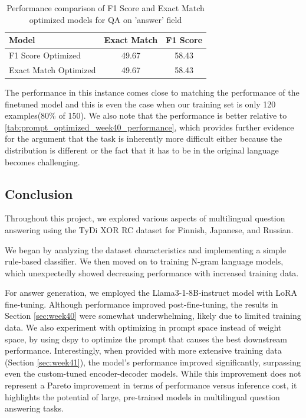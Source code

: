 \documentclass[11pt]{article}
\begin{document}

\begin{table}[ht]
    \centering
    \begin{tabular}{|l|c|c|}
        \hline
        Model & Exact Match & F1 Score \\
        \hline
        F1 Score Optimized & 49.67 & 58.43 \\
        Exact Match Optimized & 49.67 & 58.43 \\
        \hline
    \end{tabular}
    \caption{Performance comparison of F1 Score and Exact Match optimized models for QA on 'answer' field}
    \label{tab:prompt_optimized_week41_performance}
\end{table}


The performance in this instance comes close to matching the performance of the finetuned model and this is even the case when our training set is only 120 examples(80\% of 150).
We also note that the performance is better relative to \ref{tab:prompt_optimized_week40_performance}, which provides further evidence for the argument that the task is inherently more difficult either because the distribution is different or the fact that it has to be in the original language becomes challenging.
\subsection{Conclusion}

Throughout this project, we explored various aspects of multilingual question answering using the TyDi XOR RC dataset for Finnish, Japanese, and Russian. 

We began by analyzing the dataset characteristics and implementing a simple rule-based classifier. We then moved on to training N-gram language models, which unexpectedly showed decreasing performance with increased training data. 

For answer generation, we employed the Llama3-1-8B-instruct model with LoRA fine-tuning. Although performance improved post-fine-tuning, the results in Section \ref{sec:week40} were somewhat underwhelming, likely due to limited training data. We also experiment with optimizing in prompt space instead of weight space, by using dspy to optimize the prompt that causes the best downstream performance.
Interestingly, when provided with more extensive training data (Section \ref{sec:week41}), the model's performance improved significantly, surpassing even the custom-tuned encoder-decoder models. While this improvement does not represent a Pareto improvement in terms of performance versus inference cost, it highlights the potential of large, pre-trained models in multilingual question answering tasks.
\end{document}
